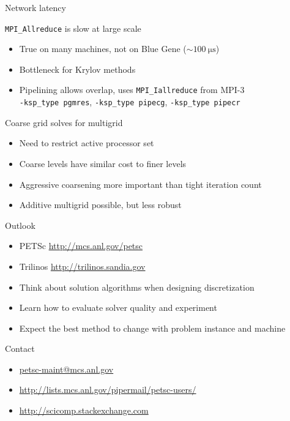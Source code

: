 \documentclass{beamer}
\begin{document}
\begin{frame}{Network latency}
  \begin{block}{\texttt{MPI\_Allreduce} is slow at large scale}
    \begin{itemize}
    \item True on many machines, not on Blue Gene ($\sim \SI{100}{\micro\second}$)
    \item Bottleneck for Krylov methods
    \item Pipelining allows overlap, uses \texttt{MPI\_Iallreduce} from MPI-3\\
      \texttt{-ksp\_type pgmres}, \texttt{-ksp\_type pipecg}, \texttt{-ksp\_type pipecr}
    \end{itemize}
  \end{block}
  \begin{block}{Coarse grid solves for multigrid}
    \begin{itemize}
    \item Need to restrict active processor set
    \item Coarse levels have similar cost to finer levels
    \item Aggressive coarsening more important than tight iteration count
    \item Additive multigrid possible, but less robust
    \end{itemize}
  \end{block}
\end{frame}

\begin{frame}{Outlook}
  \begin{itemize}
  \item PETSc \url{http://mcs.anl.gov/petsc}
  \item Trilinos \url{http://trilinos.sandia.gov}
  \item Think about solution algorithms when designing discretization
  \item Learn how to evaluate solver quality and experiment
  \item Expect the best method to change with problem instance and machine
  \end{itemize}
  \begin{block}{Contact}
    \begin{itemize}
    \item \url{petsc-maint@mcs.anl.gov}
    \item \url{http://lists.mcs.anl.gov/pipermail/petsc-users/}
    \item \url{http://scicomp.stackexchange.com}
    \end{itemize}
  \end{block}
\end{frame}
\end{document}
